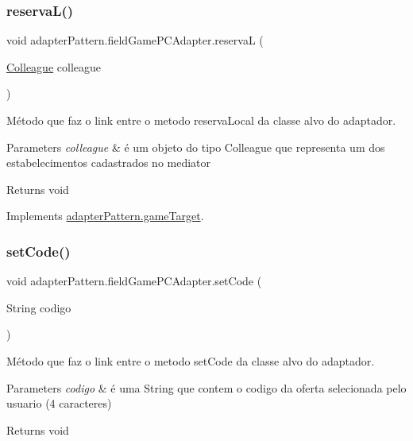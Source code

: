 \subsubsection{\texorpdfstring{reservaL()}{reservaL()}}
{\footnotesize\ttfamily void adapter\+Pattern.\+field\+Game\+P\+C\+Adapter.\+reservaL (\begin{DoxyParamCaption}\item[{\mbox{\hyperlink{classmediator_pattern_1_1_colleague}{Colleague}}}]{colleague }\end{DoxyParamCaption})}



Método que faz o link entre o metodo reserva\+Local da classe alvo do adaptador. 


\begin{DoxyParams}{Parameters}
{\em colleague} & é um objeto do tipo Colleague que representa um dos estabelecimentos cadastrados no mediator \\
\hline
\end{DoxyParams}
\begin{DoxyReturn}{Returns}
void 
\end{DoxyReturn}


Implements \mbox{\hyperlink{interfaceadapter_pattern_1_1game_target_a663405a3d10988de25c6ea3ef63c68eb}{adapter\+Pattern.\+game\+Target}}.

\mbox{\label{classadapter_pattern_1_1field_game_p_c_adapter_afe12ddbea935f9a022cecbceab127307}} 
\subsubsection{\texorpdfstring{setCode()}{setCode()}}
{\footnotesize\ttfamily void adapter\+Pattern.\+field\+Game\+P\+C\+Adapter.\+set\+Code (\begin{DoxyParamCaption}\item[{String}]{codigo }\end{DoxyParamCaption})}



Método que faz o link entre o metodo set\+Code da classe alvo do adaptador. 


\begin{DoxyParams}{Parameters}
{\em codigo} & é uma String que contem o codigo da oferta selecionada pelo usuario (4 caracteres) \\
\hline
\end{DoxyParams}
\begin{DoxyReturn}{Returns}
void 
\end{DoxyReturn}


